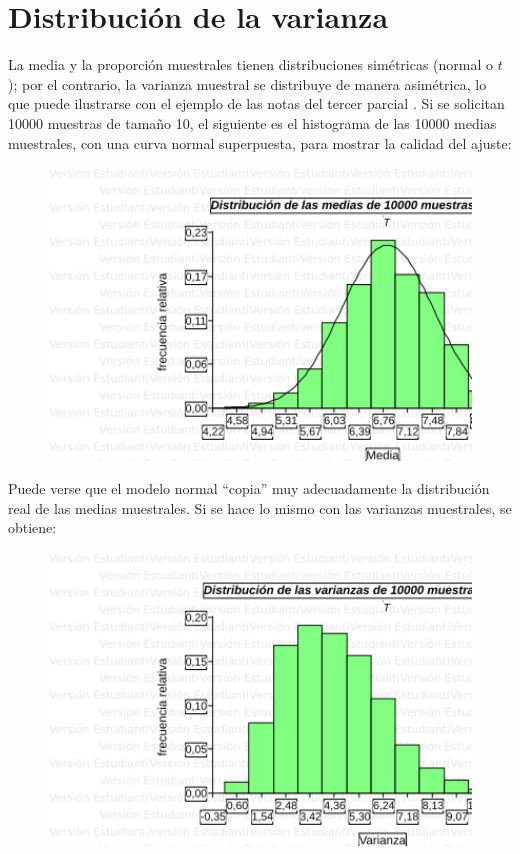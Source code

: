 \documentclass[]{book}
\begin{document}
\hypertarget{distribuciuxf3n-de-la-varianza}{%
\section{Distribución de la varianza}\label{distribuciuxf3n-de-la-varianza}}

La media y la proporción muestrales tienen distribuciones simétricas
(normal o \(t\)); por el contrario, la varianza muestral se distribuye de
manera asimétrica, lo que puede ilustrarse con el ejemplo de las notas del tercer parcial . Si se
solicitan 10000 muestras de tamaño 10, el siguiente es el histograma de
las 10000 medias muestrales, con una curva normal superpuesta, para
mostrar la calidad del ajuste:

\begin{figure}

{\centering \includegraphics[width=5.6in]{imagenes/image157} 

}

\end{figure}

Puede verse que el modelo normal ``copia'' muy adecuadamente la
distribución real de las medias muestrales. Si se hace lo mismo con las
varianzas muestrales, se obtiene:

\begin{figure}

{\centering \includegraphics[width=5.6in]{imagenes/image158} 

}

\end{figure}
\end{document}
